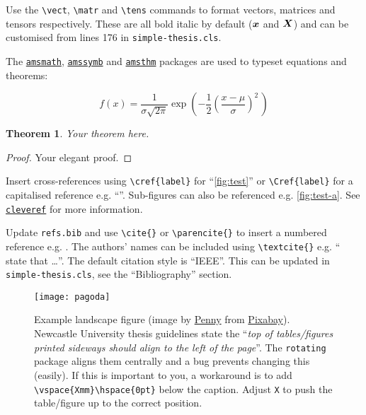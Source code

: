 Use the \verb|\vect|, \verb|\matr| and \verb|\tens| commands to format vectors, matrices and
tensors respectively. These are all bold italic by default ($\bm{x}$ and $\bm{X}$) and
can be customised from lines 176 in \texttt{simple-thesis.cls}.

The \href{https://ctan.org/pkg/amsmath}{\texttt{amsmath}}, \href{https://ctan.org/pkg/amssymb}{\texttt{amssymb}}
and \href{https://ctan.org/pkg/amsthm}{\texttt{amsthm}} packages are used to typeset equations
and theorems:

\begin{equation}
  f(x) = \frac{1}{\sigma\sqrt{2\pi}} \exp\left( -\frac{1}{2}\left(\frac{x-\mu}{\sigma}\right)^{\!2}\,\right)
\end{equation}

\newtheorem{theorem}{Theorem}
\begin{theorem}
  Your theorem here.
\end{theorem}
\begin{proof}
  Your elegant proof.
\end{proof}


Insert cross-references using \verb|\cref{label}| for ``\cref{fig:test}'' or \verb|\Cref{label}|
for a capitalised reference e.g. ``''. Sub-figures can also be referenced
e.g. \cref{fig:test-a}. See \href{https://ctan.org/pkg/cleveref}{\texttt{cleveref}} for more
information.


Update \texttt{refs.bib} and use \verb|\cite{}| or \verb|\parencite{}| to insert a numbered
reference e.g. \cite{lecun_deep_2015}. The authors' names can be included using \verb|\textcite{}|
e.g. ``\textcite{lecun_deep_2015} state that \dots''. The default citation style is ``IEEE''.
This can be updated in \texttt{simple-thesis.cls}, see the ``Bibliography'' section.

\begin{sidewaysfigure}
  \centering
  \texttt{[image: pagoda]}
  \caption{Example landscape figure (image by \href{https://pixabay.com/users/pen_ash-5526837/?utm_source=link-attribution&amp;utm_medium=referral&amp;utm_campaign=image&amp;utm_content=7868621}{Penny}
  from \href{https://pixabay.com//?utm_source=link-attribution&amp;utm_medium=referral&amp;utm_campaign=image&amp;utm_content=7868621}{Pixabay}).
  Newcastle University thesis guidelines state the ``\textit{top of tables/figures printed sideways
  should align to the left of the page}''. The \texttt{rotating} package aligns them centrally and
  a bug prevents changing this (easily). If this is important to you, a workaround is to add
  \texttt{\textbackslash vspace\{Xmm\}\textbackslash hspace\{0pt\}} below the caption. Adjust
  \texttt{X} to push the table/figure up to the correct position.}
  \label{fig:landscape}
  \vspace{7mm}\hspace{0pt}
\end{sidewaysfigure}

